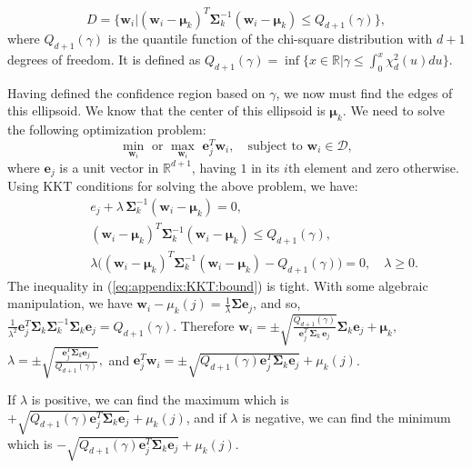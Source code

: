 \documentclass[journal,draftclsnofoot,onecolumn,12pt]{IEEEtran}%
\newcommand{\mub}{\boldsymbol{\mu}}
\newcommand{\Sigmab}{\boldsymbol{\Sigma}}
\newcommand{\Db}{\mathcal{D}}
\newcommand{\eb}{\mathbf{e}}
\newcommand{\wb}{\boldsymbol{w}}
\begin{document}
	\begin{equation}
	D=\big\{\wb_i|(\wb_i-\mub_k)^T\Sigmab_k^{-1}(\wb_i-\mub_k)\leq Q_{d+1}(\gamma)\big\},
	\end{equation}
	where $Q_{d+1}(\gamma)$ is the quantile function of the chi-square distribution with $d+1$ degrees of freedom. It is defined as
	{$
	Q_{d+1}(\gamma)=\inf\Big\{x\in \mathds{R}| \gamma\leq \int_{0}^{x} \chi_d^2(u) du\Big\}.
	$}
	
	Having defined the confidence region based on $\gamma$, we now must find the edges of this ellipsoid. We know that the center of this ellipsoid is $\mub_k$. We need to solve the  following optimization problem:
\begin{equation}
	\underset{\wb_i}{\min} \,\,\text{or}\,\, \underset{\wb_i}{\max} \,\,\eb_j^T\wb_i,\quad \text{subject to} \,\,  \wb_i \in \Db,
\end{equation}
	where $\boldsymbol{e}_j$ is a unit vector in $\mathds{R}^{d+1}$, having $1$ in its $i$th element and zero otherwise. Using KKT conditions for solving the above problem, we have:
	\begin{subequations}
		\begin{align}
		\qquad &e_j+\lambda\,\Sigmab_k^{-1}(\wb_i-\mub_k)=0,\\
		 \qquad &(\wb_i-\mub_k)^T\Sigmab_k^{-1}(\wb_i-\mub_k)\leq Q_{d+1}(\gamma),\label{eq:appendix:KKT:bound}\\
		 \qquad &\lambda\Big((\wb_i-\mub_k)^T\Sigmab_k^{-1}(\wb_i-\mub_k)- Q_{d+1}(\gamma)\Big)=0,		\quad \lambda\geq 0. 
		\end{align}
	\end{subequations}
	The inequality in (\ref{eq:appendix:KKT:bound}) is tight. With some algebraic manipulation, we have 	$\wb_i-\mu_k(j)=\frac{1}{\lambda}\Sigmab \boldsymbol{e}_j$, and so, $\frac{1}{\lambda^2} \eb_j^T\Sigmab_k \Sigmab_k^{-1}\Sigmab_k\eb_j=Q_{d+1}(\gamma)$. Therefore
		$\wb_i=\pm \sqrt{\frac{Q_{d+1}(\gamma)}{\boldsymbol{e}_j^T\,\Sigmab_k\,\boldsymbol{e}_j}}\Sigmab_k \boldsymbol{e}_j+\mub_k,$ 
$\lambda =\pm\sqrt{\frac{\eb_j^T\Sigmab_k\eb_j}{Q_{d+1}(\gamma)}},$ and
        $\eb_j^T \wb_i=\pm \sqrt{Q_{d+1}(\gamma) {\eb_j^T\Sigmab_k\eb_j}}+\mu_k(j)$.
	
	If $\lambda$ is positive, we can find the maximum which is $+ \sqrt{Q_{d+1}(\gamma) {\eb_j^T\Sigmab_k\eb_j}}+\mu_k(j)$, and if $\lambda$ is negative, we can find the minimum which is $- \sqrt{Q_{d+1}(\gamma) {\eb_j^T\Sigmab_k\eb_j}}+\mu_k(j)$.
\end{document}
